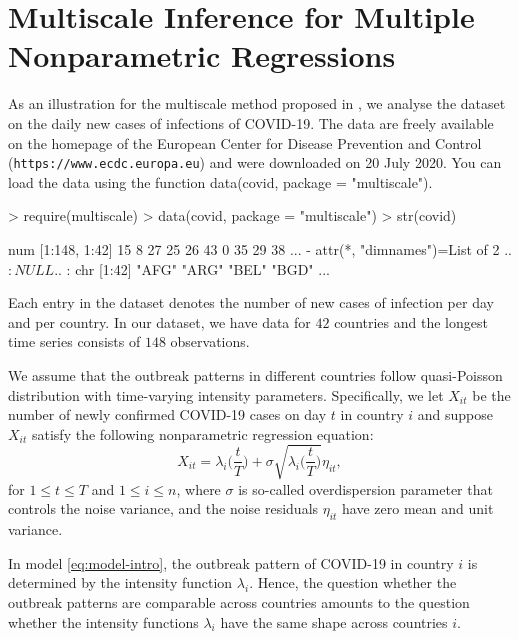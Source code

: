 \documentclass[a4paper]{scrartcl}
\begin{document}
\section{Multiscale Inference for Multiple Nonparametric Regressions}\label{sec:multiple}

As an illustration for the multiscale method proposed in \cite{KhismatullinaVogt2020b}, we analyse the dataset on the daily new cases of infections of COVID-19. The data are freely available on the homepage of the European Center for Disease Prevention and Control (\texttt{https://www.ecdc.europa.eu}) and were downloaded on 20 July 2020. You can load the data using the function data(covid, package = "multiscale").

\begin{Schunk}
\begin{Sinput}
> require(multiscale)
> data(covid, package = "multiscale")
> str(covid)
\end{Sinput}
\begin{Soutput}
 num [1:148, 1:42] 15 8 27 25 26 43 0 35 29 38 ...
 - attr(*, "dimnames")=List of 2
  ..$ : NULL
  ..$ : chr [1:42] "AFG" "ARG" "BEL" "BGD" ...
\end{Soutput}
\end{Schunk}

Each entry in the dataset denotes the number of new cases of infection per day and per country. In our dataset, we have data for $42$ countries and the longest time series consists of $148$ observations.

We assume that the outbreak patterns in different countries follow quasi-Poisson distribution with time-varying intensity parameters. Specifically, we let $X_{it}$ be the number of newly confirmed COVID-19 cases on day $t$ in country $i$ and suppose $X_{it}$ satisfy the following nonparametric regression equation:
\begin{equation}\label{eq:model-intro}
X_{it} = \lambda_i\Big(\frac{t}{T}\Big) + \sigma \sqrt{\lambda_i\Big(\frac{t}{T}\Big)}\eta_{it}, 
\end{equation}
for $1 \le t \le T$ and $1 \le i \le n$, where $\sigma$ is so-called overdispersion parameter that controls the noise variance, and the noise residuals $\eta_{it}$ have zero mean and unit variance. 

In model \eqref{eq:model-intro}, the outbreak pattern of COVID-19 in country $i$ is determined by the intensity function $\lambda_i$. Hence, the question whether the outbreak patterns are comparable across countries amounts to the question whether the intensity functions $\lambda_i$ have the same shape across countries $i$.
\end{document}

